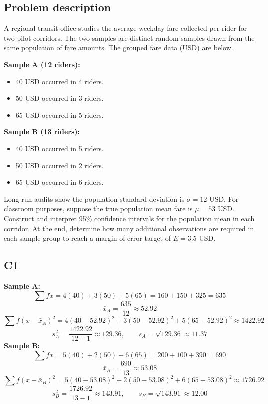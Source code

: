	\begin{ExamProblems}
		\newpage
		\item
		\subsection*{Problem description}
		A regional transit office studies the average weekday fare collected per rider for two pilot corridors.
		The two samples are distinct random samples drawn from the same population of fare amounts.
		The grouped fare data (USD) are below.

		\textbf{Sample A (12 riders):}
		\begin{itemize}
			\item 40 USD occurred in 4 riders.
			\item 50 USD occurred in 3 riders.
			\item 65 USD occurred in 5 riders.
		\end{itemize}

		\textbf{Sample B (13 riders):}
		\begin{itemize}
			\item 40 USD occurred in 5 riders.
			\item 50 USD occurred in 2 riders.
			\item 65 USD occurred in 6 riders.
		\end{itemize}

		Long-run audits show the population standard deviation is $\sigma = 12$ USD.
		For classroom purposes, suppose the true population mean fare is $\mu = 53$ USD.
		Construct and interpret 95\% confidence intervals for the population mean in each corridor.
		At the end, determine how many additional observations are required in each sample group to reach a margin of error target of $E = 3.5$ USD.

		\subsection*{C1}
		\textbf{Sample A:}
		\[
		\sum f x = 4(40) + 3(50) + 5(65) = 160 + 150 + 325 = 635
		\]
		\[
		\bar{x}_A = \frac{635}{12} \approx 52.92
		\]
		\[
		\sum f(x-\bar{x}_A)^2 = 4(40-52.92)^2 + 3(50-52.92)^2 + 5(65-52.92)^2 \approx 1422.92
		\]
		\[
		s_A^2 = \frac{1422.92}{12-1} \approx 129.36, \qquad s_A = \sqrt{129.36} \approx 11.37
		\]
		\textbf{Sample B:}
		\[
		\sum f x = 5(40) + 2(50) + 6(65) = 200 + 100 + 390 = 690
		\]
		\[
		\bar{x}_B = \frac{690}{13} \approx 53.08
		\]
		\[
		\sum f(x-\bar{x}_B)^2 = 5(40-53.08)^2 + 2(50-53.08)^2 + 6(65-53.08)^2 \approx 1726.92
		\]
		\[
		s_B^2 = \frac{1726.92}{13-1} \approx 143.91, \qquad s_B = \sqrt{143.91} \approx 12.00
		\]


\end{ExamProblems}
